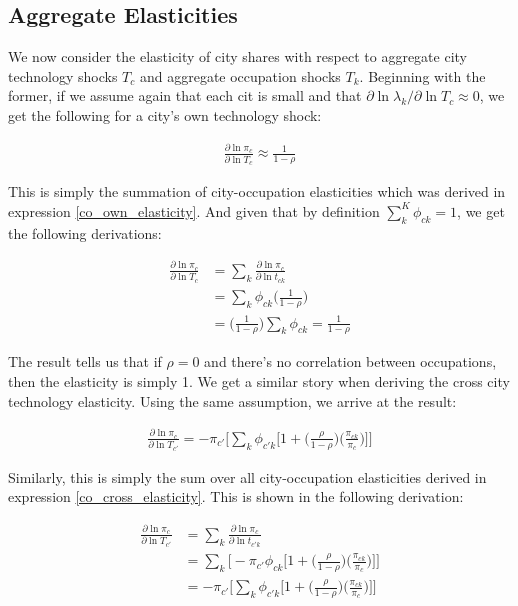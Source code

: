 \documentclass[10pt]{article}
\begin{document}
\subsection{Aggregate Elasticities}

We now consider the elasticity of city shares with respect to aggregate city technology shocks $T_c$ and aggregate occupation shocks $T_k$. Beginning with the former, if we assume again that each cit is small and that $\partial \ln \lambda_k / \partial \ln T_c \approx 0$, we get the following for a city's own technology shock:

\begin{align*}
    \frac{\partial \ln \pi_c}{\partial \ln T_c} \approx \frac{1}{1 - \rho}
\end{align*}

This is simply the summation of city-occupation elasticities which was derived in expression \ref{co_own_elasticity}. And given that by definition $\sum \limits_k^K \phi_{ck} = 1$, we get the following derivations:

\begin{align*}
    \frac{\partial{\ln{\pi_{c}}}}{\partial\ln{T_{c}}} & = \sum\limits_{k}\frac{\partial{\ln{\pi_{c}}}}{\partial\ln{t_{ck}}} \\ &= \sum\limits_{k}\phi_{ck}\Bigg(\frac{1}{1-\rho}\Bigg) \\ &= \Bigg(\frac{1}{1-\rho}\Bigg)\sum\limits_{k}\phi_{ck} = \frac{1}{1-\rho}
\end{align*}

The result tells us that if $\rho = 0$ and there's no correlation between occupations, then the elasticity is simply 1. We get a similar story when deriving the cross city technology elasticity. Using the same assumption, we arrive at the result:

\begin{align}
    \frac{\partial\ln{\pi_{c}}}{\partial\ln{T_{c'}}} = -\pi_{c'}\Bigg[\sum\limits_{k}\phi_{{c'}k}\Big[1+\Big(\frac{\rho}{1-\rho}\Big)\Big(\frac{\pi_{ck}}{\pi_{c}}\Big)\Big]\Bigg]
\end{align}

Similarly, this is simply the sum over all city-occupation elasticities derived in expression \ref{co_cross_elasticity}. This is shown in the following derivation:

\begin{align*}
    \frac{\partial\ln{\pi_{c}}}{\partial\ln{T_{c'}}} & = \sum\limits_{k}\frac{\partial\ln{\pi_{c}}}{\partial\ln{t_{{c'}k}}} \\ &= \sum\limits_{k}\Bigg[-{\pi_{c'}}{\phi_{ck}}\Big[1+\Big(\frac{\rho}{1-\rho}\Big)\Big(\frac{\pi_{ck}}{\pi_{c}}\Big)\Big]\Bigg]\\ &= -\pi_{c'}\Bigg[\sum\limits_{k}\phi_{{c'}k}\Big[1+\Big(\frac{\rho}{1-\rho}\Big)\Big(\frac{\pi_{ck}}{\pi_{c}}\Big)\Big]\Bigg]
\end{align*}
\end{document}
